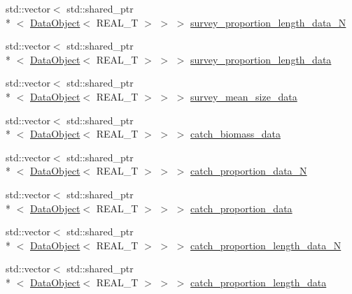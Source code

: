 \begin{DoxyCompactItemize}
\item 
std\-::vector$<$ std\-::shared\-\_\-ptr\\*
$<$ \hyperlink{structmas_1_1_data_object}{Data\-Object}$<$ R\-E\-A\-L\-\_\-\-T $>$ $>$ $>$ \hyperlink{structmas_1_1_area_a33b8c87411a6eb87d89faf910a6e33d1}{survey\-\_\-proportion\-\_\-length\-\_\-data\-\_\-\-N}
\item 
std\-::vector$<$ std\-::shared\-\_\-ptr\\*
$<$ \hyperlink{structmas_1_1_data_object}{Data\-Object}$<$ R\-E\-A\-L\-\_\-\-T $>$ $>$ $>$ \hyperlink{structmas_1_1_area_a267134d80dcd5d56d4e63b158ebaacdf}{survey\-\_\-proportion\-\_\-length\-\_\-data}
\item 
std\-::vector$<$ std\-::shared\-\_\-ptr\\*
$<$ \hyperlink{structmas_1_1_data_object}{Data\-Object}$<$ R\-E\-A\-L\-\_\-\-T $>$ $>$ $>$ \hyperlink{structmas_1_1_area_a2710e056d30edc617f3073d3df19f28f}{survey\-\_\-mean\-\_\-size\-\_\-data}
\item 
std\-::vector$<$ std\-::shared\-\_\-ptr\\*
$<$ \hyperlink{structmas_1_1_data_object}{Data\-Object}$<$ R\-E\-A\-L\-\_\-\-T $>$ $>$ $>$ \hyperlink{structmas_1_1_area_ade9dc79427b4c9c46ec5c3ebae967ff0}{catch\-\_\-biomass\-\_\-data}
\item 
std\-::vector$<$ std\-::shared\-\_\-ptr\\*
$<$ \hyperlink{structmas_1_1_data_object}{Data\-Object}$<$ R\-E\-A\-L\-\_\-\-T $>$ $>$ $>$ \hyperlink{structmas_1_1_area_a9c253f70d158bb49a41ca2c24d1dbb3b}{catch\-\_\-proportion\-\_\-data\-\_\-\-N}
\item 
std\-::vector$<$ std\-::shared\-\_\-ptr\\*
$<$ \hyperlink{structmas_1_1_data_object}{Data\-Object}$<$ R\-E\-A\-L\-\_\-\-T $>$ $>$ $>$ \hyperlink{structmas_1_1_area_a3a14e9f155e3184451799e8fc8db97ab}{catch\-\_\-proportion\-\_\-data}
\item 
std\-::vector$<$ std\-::shared\-\_\-ptr\\*
$<$ \hyperlink{structmas_1_1_data_object}{Data\-Object}$<$ R\-E\-A\-L\-\_\-\-T $>$ $>$ $>$ \hyperlink{structmas_1_1_area_a9bd6774752ab571a166a9c0a5fe169aa}{catch\-\_\-proportion\-\_\-length\-\_\-data\-\_\-\-N}
\item 
std\-::vector$<$ std\-::shared\-\_\-ptr\\*
$<$ \hyperlink{structmas_1_1_data_object}{Data\-Object}$<$ R\-E\-A\-L\-\_\-\-T $>$ $>$ $>$ \hyperlink{structmas_1_1_area_a323cc7addcbd5afb8c3295150afd7cfb}{catch\-\_\-proportion\-\_\-length\-\_\-data}

\end{DoxyCompactItemize}
